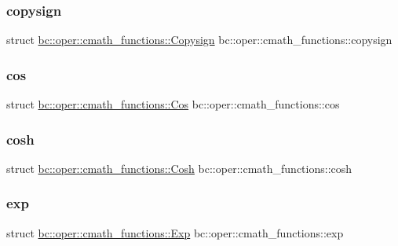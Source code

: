 \subsubsection{\texorpdfstring{copysign}{copysign}}
{\footnotesize\ttfamily struct \hyperlink{structbc_1_1oper_1_1cmath__functions_1_1Copysign}{bc\+::oper\+::cmath\+\_\+functions\+::\+Copysign}   bc\+::oper\+::cmath\+\_\+functions\+::copysign}

\mbox{\label{namespacebc_1_1oper_1_1cmath__functions_a20bb344aea6dba5c48ef7014921dc468}} 
\subsubsection{\texorpdfstring{cos}{cos}}
{\footnotesize\ttfamily struct \hyperlink{structbc_1_1oper_1_1cmath__functions_1_1Cos}{bc\+::oper\+::cmath\+\_\+functions\+::\+Cos}   bc\+::oper\+::cmath\+\_\+functions\+::cos}

\mbox{\label{namespacebc_1_1oper_1_1cmath__functions_aaacbf4194d8a898ef15f9c54db99ed15}} 
\subsubsection{\texorpdfstring{cosh}{cosh}}
{\footnotesize\ttfamily struct \hyperlink{structbc_1_1oper_1_1cmath__functions_1_1Cosh}{bc\+::oper\+::cmath\+\_\+functions\+::\+Cosh}   bc\+::oper\+::cmath\+\_\+functions\+::cosh}

\mbox{\label{namespacebc_1_1oper_1_1cmath__functions_a2843a3ce6edfc8c4395cf2754348aaf9}} 
\subsubsection{\texorpdfstring{exp}{exp}}
{\footnotesize\ttfamily struct \hyperlink{structbc_1_1oper_1_1cmath__functions_1_1Exp}{bc\+::oper\+::cmath\+\_\+functions\+::\+Exp}   bc\+::oper\+::cmath\+\_\+functions\+::exp}

